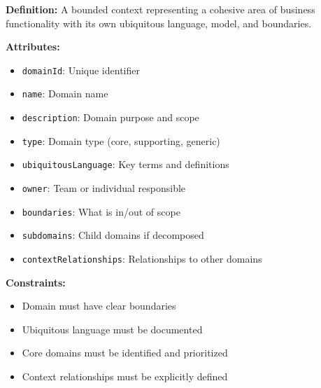 \documentclass[11pt,letterpaper]{article}
\begin{document}
\begin{definitionbox}
\textbf{Definition:} A bounded context representing a cohesive area of business functionality with its own ubiquitous language, model, and boundaries.

\textbf{Attributes:}
\begin{itemize}[nosep]
    \item \texttt{domainId}: Unique identifier
    \item \texttt{name}: Domain name
    \item \texttt{description}: Domain purpose and scope
    \item \texttt{type}: Domain type (core, supporting, generic)
    \item \texttt{ubiquitousLanguage}: Key terms and definitions
    \item \texttt{owner}: Team or individual responsible
    \item \texttt{boundaries}: What is in/out of scope
    \item \texttt{subdomains}: Child domains if decomposed
    \item \texttt{contextRelationships}: Relationships to other domains
\end{itemize}

\textbf{Constraints:}
\begin{itemize}[nosep]
    \item Domain must have clear boundaries
    \item Ubiquitous language must be documented
    \item Core domains must be identified and prioritized
    \item Context relationships must be explicitly defined
\end{itemize}
\end{definitionbox}
\end{document}
